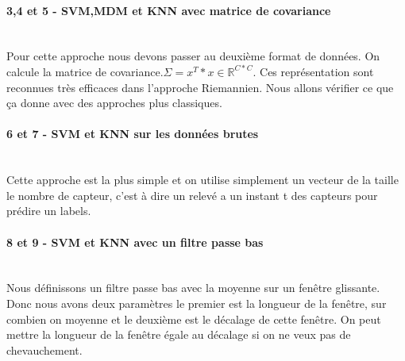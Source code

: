 \documentclass{article}[12pt]
\begin{document}
\paragraph{3,4 et 5 - SVM,MDM et KNN avec matrice de covariance }
\mbox{}\\
Pour cette approche nous devons passer au deuxième format de données. On calcule la matrice de covariance.$\Sigma=x^T*x\in \mathbb{R}^{C*C}$. Ces représentation sont reconnues très efficaces dans l'approche Riemannien. Nous allons vérifier ce que ça donne avec des approches plus classiques.
\paragraph{6 et 7 - SVM et KNN sur les données brutes}\mbox{}\\
Cette approche est la plus simple et on utilise simplement un vecteur de la taille le nombre de capteur, c'est à dire un relevé a un instant t des capteurs pour prédire un labels.
\paragraph{8 et 9 - SVM et KNN avec un filtre passe bas}\mbox{}\\
Nous définissons un filtre passe bas avec la moyenne sur un fenêtre glissante. Donc nous avons deux paramètres le premier est la longueur de la fenêtre, sur combien on moyenne et le deuxième est le décalage de cette fenêtre. On peut mettre la longueur de la fenêtre égale au décalage si on ne veux pas de chevauchement.
\end{document}
